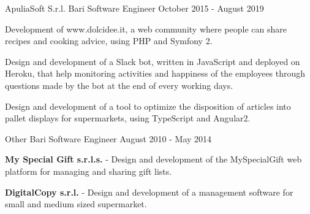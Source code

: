 \documentclass{resume} %
\begin{document}
\cvEntry
  {ApuliaSoft S.r.l.}
  {Bari}
  {Software Engineer}
  {October 2015 - August 2019}{
    \begin{cvEntryItems}
      \item Development of www.dolcidee.it, a web community where people can share recipes
            and cooking advice, using PHP and Symfony 2.
      \item Design and development of a Slack bot, written in JavaScript and deployed on
            Heroku, that help monitoring activities and happiness of the employees through
            questions made by the bot at the end of every working days.
      \item Design and development of a tool to optimize the disposition of articles into
            pallet displays for supermarkets, using TypeScript and Angular2.
    \end{cvEntryItems}
  }


\cvEntry
  {Other}
  {Bari}
  {Software Engineer}
  {August 2010 - May 2014}{
    \begin{cvEntryItems}
      \item \textbf{My Special Gift s.r.l.s.} - Design and development of the MySpecialGift web platform for managing and sharing gift lists.
      \item \textbf{DigitalCopy s.r.l.} - Design and development of a management software for small and medium sized supermarket.
    \end{cvEntryItems}
  }



\end{document}
